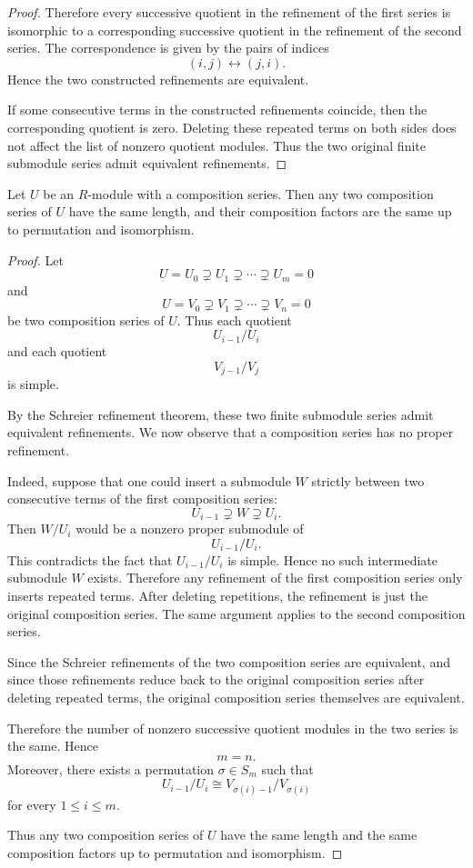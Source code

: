 \begin{proof}
    Therefore every successive quotient in the refinement of the first series is
    isomorphic to a corresponding successive quotient in the refinement of the second
    series. The correspondence is given by the pairs of indices
    \[
        (i,j)\longleftrightarrow (j,i).
    \]
    Hence the two constructed refinements are equivalent.

    If some consecutive terms in the constructed refinements coincide, then the
    corresponding quotient is zero. Deleting these repeated terms on both sides does not
    affect the list of nonzero quotient modules. Thus the two original finite submodule
    series admit equivalent refinements.
\end{proof}

\begin{theorem}
    Let $U$ be an $R$-module with a composition series. Then any two composition
    series of $U$ have the same length, and their composition factors are the same up to
    permutation and isomorphism.
\end{theorem}

\begin{proof}
    Let
    \[
        U=U_0\supsetneq U_1\supsetneq\cdots\supsetneq U_m=0
    \]
    and
    \[
        U=V_0\supsetneq V_1\supsetneq\cdots\supsetneq V_n=0
    \]
    be two composition series of $U$. Thus each quotient
    \[
        U_{i-1}/U_i
    \]
    and each quotient
    \[
        V_{j-1}/V_j
    \]
    is simple.

    By the Schreier refinement theorem, these two finite submodule series admit
    equivalent refinements. We now observe that a composition series has no proper
    refinement.

    Indeed, suppose that one could insert a submodule $W$ strictly between two
    consecutive terms of the first composition series:
    \[
        U_{i-1}\supsetneq W\supsetneq U_i.
    \]
    Then $W/U_i$ would be a nonzero proper submodule of
    \[
        U_{i-1}/U_i.
    \]
    This contradicts the fact that $U_{i-1}/U_i$ is simple. Hence no such intermediate
    submodule $W$ exists. Therefore any refinement of the first composition series only
    inserts repeated terms. After deleting repetitions, the refinement is just the
    original composition series. The same argument applies to the second composition
    series.

    Since the Schreier refinements of the two composition series are equivalent, and
    since those refinements reduce back to the original composition series after deleting
    repeated terms, the original composition series themselves are equivalent.

    Therefore the number of nonzero successive quotient modules in the two series is
    the same. Hence
    \[
        m=n.
    \]
    Moreover, there exists a permutation $\sigma\in S_m$ such that
    \[
        U_{i-1}/U_i
        \cong
        V_{\sigma(i)-1}/V_{\sigma(i)}
    \]
    for every $1\leq i\leq m$.

    Thus any two composition series of $U$ have the same length and the same
    composition factors up to permutation and isomorphism.
\end{proof}

